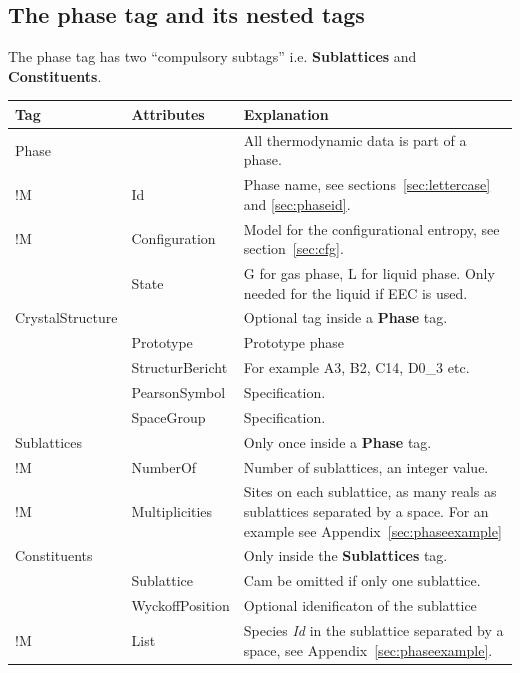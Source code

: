 \documentclass{article}
\begin{document}
\newpage 

\subsection{The phase tag and its nested tags}\label{sec:phase}\label{sec:dispart}

The phase tag has two ``compulsory subtags'' i.e. {\bf Sublattices}
and {\bf Constituents}.

\begin{tabular}{|p{} p{} p{}|}\hline
  Tag & Attributes & Explanation\\\hline

  Phase & & All thermodynamic data is part of a phase.\\
!M       & Id & Phase name, see sections~\ref{sec:lettercase} and 
               \ref{sec:phaseid}. \\

!M       & Configuration &  Model for the configurational entropy, 
                see section~\ref{sec:cfg}.\\

         & State & G for gas phase, L for liquid phase.  
                Only needed for the liquid if EEC is used.\\\hline

  CrystalStructure & & Optional tag inside a {\bf Phase} tag.\\
                
        & Prototype & Prototype phase \\
        & StructurBericht & For example A3, B2, C14, D0\_3 etc.\\
        & PearsonSymbol & Specification.\\
        & SpaceGroup & Specification.\\\hline

  Sublattices & & Only once inside a {\bf Phase} tag.\\
!M      & NumberOf &  Number of sublattices, an integer value. \\
!M      & Multiplicities & Sites on each sublattice, as many reals as
                  sublattices separated by a space.  For an example 
                  see Appendix~\ref{sec:phaseexample}\\\hline

  Constituents & & Only inside the {\bf Sublattices} tag.\\
        & Sublattice & Cam be omitted if only one sublattice.\\
        & WyckoffPosition & Optional idenificaton of the sublattice \\
!M      & List & Species {\em Id} in the sublattice separated by
                 a space, see Appendix~\ref{sec:phaseexample}.\\\hline


\end{tabular}
\end{document}
